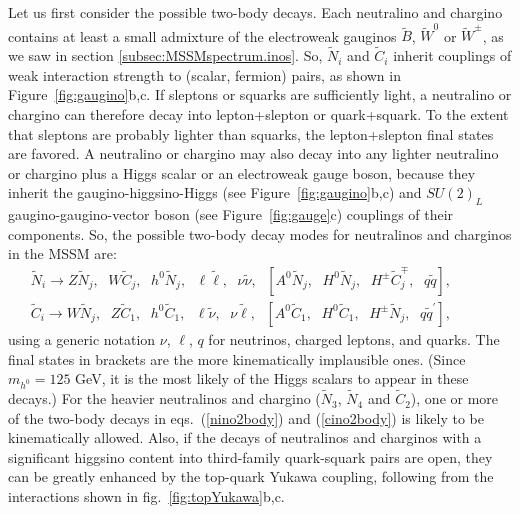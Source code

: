 \documentclass[11pt]{article}
\def\beq{\begin{eqnarray}}
\def\eeq{\end{eqnarray}}
\def\stilde{\widetilde}
\begin{document}
Let us first consider the possible two-body decays. Each neutralino and
chargino contains at least a small admixture of the electroweak gauginos
$\stilde B$, $\stilde W^0$ or $\stilde W^\pm$, as we saw in section
\ref{subsec:MSSMspectrum.inos}. So, $\stilde N_i$ and $\stilde C_i$ inherit
couplings of weak interaction strength to (scalar, fermion) pairs, as
shown in Figure~\ref{fig:gaugino}b,c. If sleptons or squarks are
sufficiently light, a neutralino or chargino can therefore decay into
lepton+slepton or quark+squark.  To the extent that sleptons are probably
lighter than squarks, the lepton+slepton final states are favored. A
neutralino or chargino may also decay into any lighter neutralino or
chargino plus a Higgs scalar or an electroweak gauge boson, because they
inherit the gaugino-higgsino-Higgs (see Figure~\ref{fig:gaugino}b,c) and
$SU(2)_L$ gaugino-gaugino-vector boson (see Figure~\ref{fig:gauge}c)
couplings of their components. So, the possible two-body decay modes for
neutralinos and charginos in the MSSM are: 
\beq
\stilde N_i \rightarrow
Z\stilde N_j,\>\>\, W\stilde C_j,\>\>\, h^0\stilde N_j,\>\>\, \ell \stilde
\ell,\>\>\,
\nu \stilde \nu,\>\>\,
[A^0 \stilde N_j,\>\>\, H^0 \stilde N_j,\>\>\, H^\pm
\stilde C_j^\mp,\>\>\,
q\stilde q],
\qquad\>\>\>{}
\label{nino2body}
\\
\stilde C_i \rightarrow
W\stilde N_j,\>\>\, Z\stilde C_1,\>\>\, h^0\stilde C_1,\>\>\, \ell \stilde
\nu,\>\>\,
\nu \stilde \ell,\>\>\,
[A^0 \stilde C_1,\>\>\, H^0 \stilde C_1,\>\>\, H^\pm \stilde N_j,\>\>\,
q\stilde q^\prime],
\qquad\>\>\>{}
\label{cino2body}
\eeq
using a generic notation $\nu$, $\ell$, $q$ for neutrinos, charged
leptons, and quarks. The final states in brackets are the more
kinematically implausible ones. (Since $m_{h^0} = 125$ GeV, it
is the most likely of the Higgs scalars to appear in these decays.) For
the heavier neutralinos and chargino ($\stilde N_3$, $\stilde N_4$ and
$\stilde C_2$), one or more of the two-body decays in
eqs.~(\ref{nino2body}) and (\ref{cino2body}) is likely to be kinematically
allowed. Also, if the decays of neutralinos and charginos with a
significant higgsino content into third-family quark-squark pairs are
open, they can be greatly enhanced by the top-quark Yukawa coupling,
following from the interactions shown in fig.~\ref{fig:topYukawa}b,c. 
\end{document}
